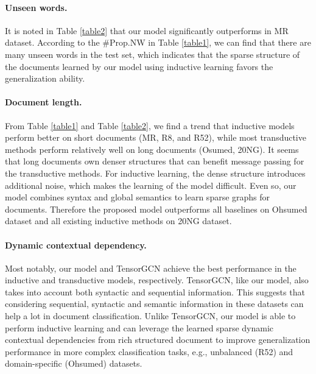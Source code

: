 \documentclass[letterpaper]{article} %
\begin{document}
\paragraph{Unseen words.}It is noted in Table \ref{table2} that our model significantly outperforms  in MR dataset. According to the \#Prop.NW in Table \ref{table1}, we can find that there are many unseen words in the test set, which indicates that the sparse structure of the documents learned by our model using inductive learning favors the generalization ability.
\paragraph{Document length.}From Table \ref{table1} and Table \ref{table2}, we find a trend that inductive models perform better on short documents (MR, R8, and R52), while most transductive methods perform relatively well on long documents (Osumed, 20NG).
It seems that long documents own denser structures that can benefit message passing for the transductive methods. For inductive learning, the dense structure introduces additional noise, which makes the learning of the model difficult.
Even so, our model combines syntax and global semantics to learn sparse graphs for documents. Therefore the proposed model outperforms all baselines on Ohsumed dataset and all existing inductive methods on 20NG dataset.
\paragraph{Dynamic contextual dependency.} Most notably, our model and TensorGCN achieve the best performance in the inductive and transductive models, respectively.
TensorGCN, like our model, also takes into account both syntactic and sequential information. This suggests that considering sequential, syntactic and semantic information in these datasets can help a lot in document classification.
Unlike TensorGCN, our model is able to perform inductive learning and can leverage the learned sparse dynamic contextual dependencies from rich structured document to improve generalization performance in more complex classification tasks, e.g., unbalanced (R52) and domain-specific (Ohsumed) datasets.
\end{document}
